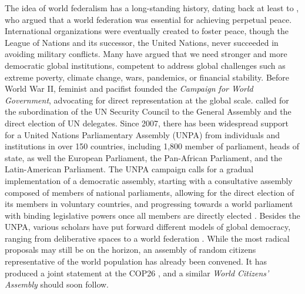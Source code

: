 \documentclass[12pt,english]{article}
\begin{document}
The idea of world federalism has a long-standing history, dating back at least to \citet{kant_zum_1795}, who argued that a world federation was essential for achieving perpetual peace. 
International organizations were eventually created to foster peace, though the League of Nations and its successor, the United Nations, never succeeded in avoiding military conflicts. 
Many have argued that we need stronger and more democratic global institutions, competent to address global challenges such as extreme poverty, climate change, wars, pandemics, or financial stability. 
Before World War II, feminist and pacifist \citet{maverick_lloyd_chaos_1937} founded the \textit{Campaign for World Government}, advocating for direct representation at the global scale. 
\citet{einstein_general_1947} called for the subordination of the UN Security Council to the General Assembly and the direct election of UN delegates. 
Since 2007, there has been widespread support for a United Nations Parliamentary Assembly (UNPA) from individuals and institutions in over 150 countries, including 1,800 member of parliament, heads of state, as well the European Parliament, the Pan-African Parliament, and the Latin-American Parliament. The UNPA campaign calls for a gradual implementation of a democratic assembly, starting with a consultative assembly composed of members of national parliaments, allowing for the direct election of its members in voluntary countries, and progressing towards a world parliament with binding legislative powers once all members are directly elected \citep{leinen_world_2018}. %
Besides the UNPA, various scholars have put forward different models of global democracy, ranging from deliberative spaces to a world federation \citep{archibugi_global_2011}. %
While the most radical proposals may still be on the horizon, an assembly of random citizens representative of the world population has already been convened. It has produced a joint statement at the COP26 \citep{global_assembly_report_2022}, and a similar \textit{World Citizens' Assembly} should soon follow. 
\end{document}
